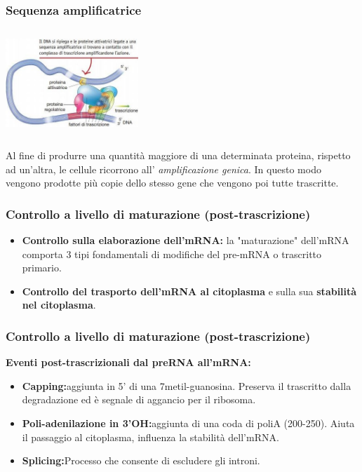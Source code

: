 \documentclass[hyperref={pdfpagelabels=false}]{beamer}
\begin{document}
\begin{frame}\frametitle{Sequenza amplificatrice}
\begin{minipage}[c]{.45\textwidth}
\includegraphics[width=5cm,height=4cm]{proteine.jpg}
\end{minipage}
\begin{minipage}[c]{.5\textwidth}
Al fine di produrre una quantit\`a maggiore di una determinata proteina, rispetto ad un'altra, le cellule ricorrono all' \emph{amplificazione genica}. In questo modo vengono prodotte pi\`u copie dello stesso gene che vengono poi tutte trascritte.
\end{minipage}
\end{frame}

\begin{frame}\frametitle{Controllo a livello di maturazione (post-trascrizione)}
\begin{itemize}
\item \textbf{Controllo sulla elaborazione dell'mRNA:} la "maturazione" dell'mRNA comporta 3 tipi fondamentali di modifiche del pre-mRNA o trascritto primario.
\item \textbf{Controllo del trasporto dell'mRNA al citoplasma} e sulla sua \textbf{stabilit\`a nel citoplasma}.
\end{itemize}
\end{frame}

\begin{frame}\frametitle{Controllo a livello di maturazione (post-trascrizione)}
\textbf{Eventi post-trascrizionali dal preRNA all'mRNA:}\\
\begin{itemize}
\item \textbf{Capping:}aggiunta in 5' di una 7metil-guanosina. Preserva il trascritto dalla degradazione ed \`e segnale di aggancio per il ribosoma.
\item \textbf{Poli-adenilazione in 3'OH:}aggiunta di una coda di poliA (200-250). Aiuta il passaggio al citoplasma, influenza la stabilit\`a dell'mRNA.
\item \textbf{Splicing:}Processo che consente di escludere gli introni.
\end{itemize}
\end{frame}
\end{document}
